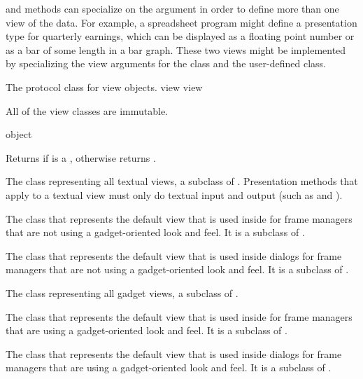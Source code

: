  and  methods can specialize on the  argument
in order to define more than one view of the data.  For example, a spreadsheet
program might define a presentation type for quarterly earnings, which can be
displayed as a floating point number or as a bar of some length in a bar graph.
These two views might be implemented by specializing the view arguments for the
 class and the user-defined  class.


The protocol class for view objects.
 {view} {view}

All of the view classes are immutable.

 {object}

Returns  if  is a , otherwise returns
.


The class representing all textual views, a subclass of .  Presentation
methods that apply to a textual view must only do textual input and output (such
as  and ).


The class that represents the default view that is used inside 
for frame managers that are not using a gadget-oriented look and feel.  It is a
subclass of .


The class that represents the default view that is used inside
 dialogs for frame managers that are not using a
gadget-oriented look and feel.  It is a subclass of .


The class representing all gadget views, a subclass of .


The class that represents the default view that is used inside 
for frame managers that are using a gadget-oriented look and feel.  It is a
subclass of .


The class that represents the default view that is used inside
 dialogs for frame managers that are using a
gadget-oriented look and feel.  It is a subclass of .

